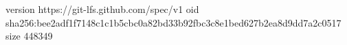 version https://git-lfs.github.com/spec/v1
oid sha256:bee2adf1f7148c1c1b5cbc0a82bd33b92fbc3c8e1bed627b2ea8d9dd7a2c0517
size 448349
